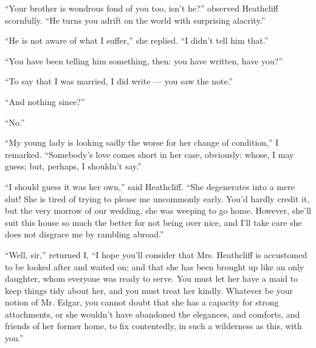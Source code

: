 \par “Your brother is wondrous fond of you too, isn't he?” observed Heathcliff scornfully. “He turns you adrift on the world with surprising alacrity.”
\par “He is not aware of what I suffer,” she replied. “I didn't tell him that.”
\par “You have been telling him something, then: you have written, have you?”
\par “To say that I was married, I did write — you saw the note.”
\par “And nothing since?”
\par “No.”
\par “My young lady is looking sadly the worse for her change of condition,” I remarked. “Somebody's love comes short in her case, obviously: whose, I may guess; but, perhaps, I shouldn't say.”
\par “I should guess it was her own,” said Heathcliff. “She degenerates into a mere slut! She is tired of trying to please me uncommonly early. You'd hardly credit it, but the very morrow of our wedding, she was weeping to go home. However, she'll suit this house so much the better for not being over nice, and I'll take care she does not disgrace me by rambling abroad.”
\par “Well, sir,” returned I, “I hope you'll consider that Mrs. Heathcliff is accustomed to be looked after and waited on; and that she has been brought up like an only daughter, whom everyone was ready to serve. You must let her have a maid to keep things tidy about her, and you must treat her kindly. Whatever be your notion of Mr. Edgar, you cannot doubt that she has a capacity for strong attachments, or she wouldn't have abandoned the elegances, and comforts, and friends of her former home, to fix contentedly, in such a wilderness as this, with you.”
